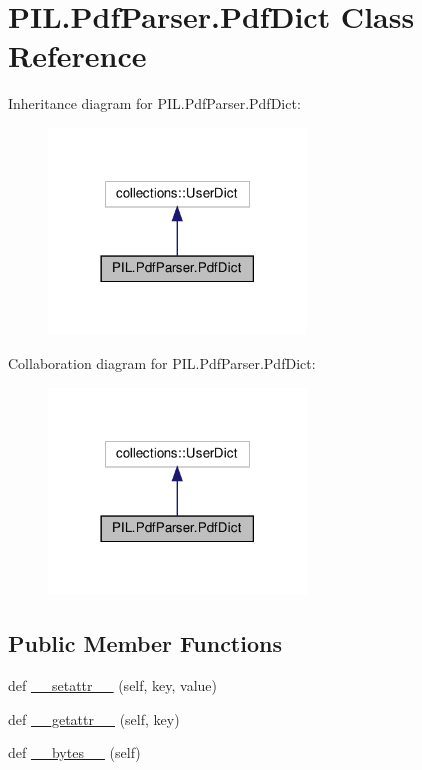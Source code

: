 \hypertarget{classPIL_1_1PdfParser_1_1PdfDict}{}\section{P\+I\+L.\+Pdf\+Parser.\+Pdf\+Dict Class Reference}
\label{classPIL_1_1PdfParser_1_1PdfDict}


Inheritance diagram for P\+I\+L.\+Pdf\+Parser.\+Pdf\+Dict\+:
\nopagebreak
\begin{figure}[H]
\begin{center}
\leavevmode
\includegraphics[width=194pt]{classPIL_1_1PdfParser_1_1PdfDict__inherit__graph}
\end{center}
\end{figure}


Collaboration diagram for P\+I\+L.\+Pdf\+Parser.\+Pdf\+Dict\+:
\nopagebreak
\begin{figure}[H]
\begin{center}
\leavevmode
\includegraphics[width=194pt]{classPIL_1_1PdfParser_1_1PdfDict__coll__graph}
\end{center}
\end{figure}
\subsection*{Public Member Functions}
\begin{DoxyCompactItemize}
\item 
def \hyperlink{classPIL_1_1PdfParser_1_1PdfDict_afc00c1068304020fdfc403439bd20e2d}{\+\_\+\+\_\+setattr\+\_\+\+\_\+} (self, key, value)
\item 
def \hyperlink{classPIL_1_1PdfParser_1_1PdfDict_aee40ee820f26cbd6788cf50f8d9109db}{\+\_\+\+\_\+getattr\+\_\+\+\_\+} (self, key)
\item 
def \hyperlink{classPIL_1_1PdfParser_1_1PdfDict_a3af0a13f91ac66652e33e1654dcc334f}{\+\_\+\+\_\+bytes\+\_\+\+\_\+} (self)
\end{DoxyCompactItemize}


